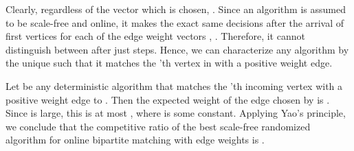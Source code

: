 \documentclass[11pt]{article}
\begin{document}
Clearly, regardless of the vector which is chosen, . Since an algorithm is assumed to be scale-free and online, it makes the exact same decisions after the arrival of first  vertices for each of the edge weight vectors , . Therefore, it cannot distinguish between  after just  steps. Hence, we can characterize any algorithm by the unique  such that it matches the 'th vertex in  with a positive weight edge.

Let  be any deterministic algorithm that matches the 'th incoming vertex with a positive weight edge to . Then the expected weight of the edge chosen by  is . Since  is large, this is at most , where  is some constant. Applying Yao's principle, we conclude that the competitive ratio of the best scale-free randomized algorithm for online bipartite matching with edge weights is . 
\end{document}
